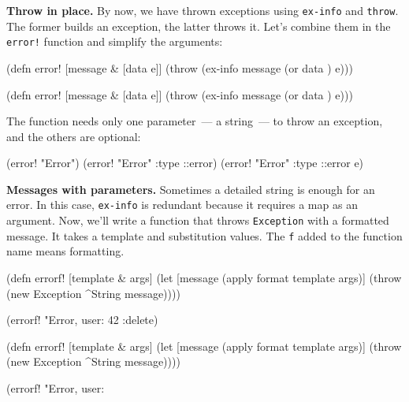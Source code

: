 \textbf{Throw in place.} By now, we have thrown exceptions using \verb|ex-info| and \verb|throw|. The former builds an exception, the latter throws it. Let's combine them in the \verb|error!| function and simplify the arguments:


\ifx\DEVICETYPE\MOBILE

\begin{clojure}
(defn error! [message & [data e]]
  (throw (ex-info message
           (or data {}) e)))
\end{clojure}

\else

\begin{clojure}
(defn error! [message & [data e]]
  (throw (ex-info message (or data {}) e)))
\end{clojure}

\fi

\noindent
The function needs only one parameter~--- a string~--- to throw an exception, and the others are optional:

\begin{clojure}
(error! "Error")
(error! "Error" {:type ::error})
(error! "Error" {:type ::error} e)
\end{clojure}

\textbf{ Messages with parameters.} Sometimes a detailed string is enough for an error. In this case, \verb|ex-info| is redundant because it requires a map as an argument. Now, we'll write a function that throws \verb|Exception| with a formatted message. It takes a template and substitution values.
The \verb|f| added to the function name means formatting.


\ifx\DEVICETYPE\MOBILE

\begin{clojure}
(defn errorf! [template & args]
  (let [message (apply format
                  template args)]
    (throw (new Exception
             ^String message))))

(errorf! "Error, user: %
  42 :delete)
\end{clojure}

\else

\begin{clojure}
(defn errorf! [template & args]
  (let [message (apply format template args)]
    (throw (new Exception ^String message))))

(errorf! "Error, user: %
\end{clojure}

